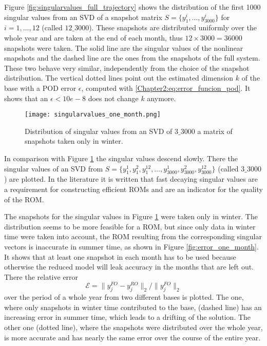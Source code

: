 Figure \ref{fig:singularvalues_full_trajectory} shows the distribution of the first 1000 singular values from an SVD of a snapshot matrix  $S = \{y^{i}_1,\ldots,y^{i}_{3000}\}$ for $i =1,\ldots,12$ (called $12\_3000$). These snapshots are distributed uniformly over
the whole year and are taken at the end of each month, thus $12 \times 3000 = 36000$ snapshots were taken. 
The solid line are the singular values of the nonlinear snapshots and the dashed line are the ones from the snapshots of the full system. 
These two behave very similar, independently from the choice of the snapshot distribution.
The vertical dotted lines point out the estimated dimension $k$ of the base with a POD error $\epsilon$, computed with \eqref{Chapter2:eq:error_funcion_pod}.
It shows that an $\epsilon < 10e-8$ does not change $k$ anymore. 

\begin{figure}[H]
\centering
  \texttt{[image: singularvalues\_one\_month.png]}
  \caption{Distribution of singular values from an SVD of $3\_3000$ a matrix of snapshots taken only in winter.}
  \label{fig:singularvalues_one_month}
\end{figure}

In comparison with Figure \ref{fig:singularvalues_one_month} the singular values descend slowly. There the singular values of an SVD from $S = \{y^{1}_1,y^{2}_1,y^{12}_1,\ldots,y^{1}_{3000},y^{2}_{3000},y^{12}_{3000} \}$  (called $3\_3000$)
are plotted. In the literature \cite[][p. 261]{ROM_Book} it is written that fast decaying singular values are a requirement for constructing efficient ROMs and
are an indicator for the quality of the ROM.


The snapshots for the singular values in Figure \ref{fig:singularvalues_one_month} were taken only in winter. The distribution seems to be more feasible for a ROM, but since
only data in winter time were taken into account, the ROM resulting from the corresponding singular vectors is inaccurate in summer time, as shown in Figure \ref{fig:error_one_month}. 
It shows that at least one snapshot in each month has to be used because otherwise the reduced model will leak accuracy in the months that are left out. There the relative error
\begin{equation}\label{eq:relativeError}
 \mathcal{E} = \parallel y^{FO}_j - y^{RO}_j \parallel_2/ \parallel y^{FO}_j \parallel_2
\end{equation}
over the period of a whole year from two different bases is plotted. The one, where only snapshots in winter
time contributed to the base, (dashed line) has an increasing error in summer time, which leads to a drifting of the solution. The other one (dotted line), where the snapshots were distributed over the whole year, is more accurate and has nearly the same error over the course of the entire year.

